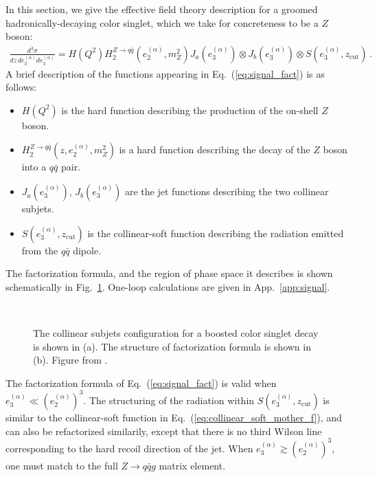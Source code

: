 \documentclass[a4paper,11pt]{article}
\newcommand{\ecf}[2]{e_{#1}^{(#2)}}
\def\zcut{z_{\text{cut}}}
\DeclareRobustCommand{\App}[1]{App.~\ref{#1}}
\DeclareRobustCommand{\Fig}[1]{Fig.~\ref{#1}}
\DeclareRobustCommand{\Eq}[1]{Eq.~(\ref{#1})}
\begin{document}
In this section, we give the effective field theory description for a groomed hadronically-decaying color singlet, which we take for concreteness to be a $Z$ boson:
\begin{align}\label{eq:signal_fact}
\frac{d^3\sigma}{dz\, d\ecf{2}{\alpha}d\ecf{3}{\alpha}}= H(Q^2)H_2^{Z\rightarrow q \bar q}(\ecf{2}{\alpha},m_Z^2) J_a(\ecf{3}{\alpha})\otimes J_b(\ecf{3}{\alpha})\otimes S(\ecf{3}{\alpha},\zcut) \,. 
\end{align}
A brief description of the functions appearing in \Eq{eq:signal_fact} is as follows:
 \begin{itemize}
 \item $H(Q^2)$ is the hard function describing the production of the on-shell $Z$ boson.
 \item $H_2^{Z\rightarrow q \bar q}(z,\ecf{2}{\alpha},m_Z^2)$ is a hard function describing the decay of the $Z$ boson into a $q\bar q$ pair.  
 \item  $J_a(\ecf{3}{\alpha})$, $J_b(\ecf{3}{\alpha})$ are the jet functions describing the two collinear subjets.
 \item  $S(\ecf{3}{\alpha},\zcut)$ is the collinear-soft function describing the radiation emitted from the $q\bar q $ dipole.
 \end{itemize}
The factorization formula, and the region of phase space it describes is shown schematically in \Fig{fig:signal_setup}. One-loop calculations are given in \App{app:signal}. 


\begin{figure}
\begin{center}
\ \ 
\end{center}
\caption{The collinear subjets configuration for a boosted color singlet decay is shown in (a).  The structure of factorization formula is shown in (b). Figure from \cite{Larkoski:2015kga}.
}
\label{fig:signal_setup}
\end{figure}



The factorization formula of \Eq{eq:signal_fact} is valid when $\ecf{3}{\alpha} \ll  ( \ecf{2}{\alpha} )^{3}$. The structuring of the radiation within $S(\ecf{3}{\alpha},\zcut)$ is similar to the collinear-soft function in \Eq{eq:collinear_soft_mother_f}, and can also be refactorized similarily, except that there is no third Wilson line corresponding to the hard recoil direction of the jet. When $\ecf{3}{\alpha} \gtrsim  ( \ecf{2}{\alpha} )^{3}$, one must match to the full $Z\to q\bar q g$ matrix element. 
\end{document}
